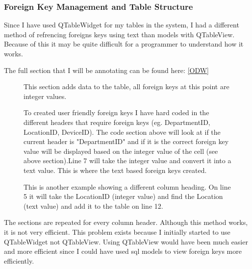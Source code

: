 \begin{landscape}
\subsubsection{Foreign Key Management and Table Structure}

Since I have used QTableWidget for my tables in the system, I had a different method of refrencing foreigns keys using text  than models with QTableView. Because of this it may be quite difficult for a programmer to understand how it works.

The full section that I will be annotating can be found here: \ref{ODW}

\begin{figure}[H]
    \caption{This section adds data to the table, all foreign keys at this point are integer values.}  
\end{figure}

\begin{figure}[H]
\begin{small}
\end{small}
    \caption{To created user friendly foreign keys I have hard coded in the different headers that require foreign keys (eg. DepartmentID, LocationID, DeviceID). The code section above will look at if the current header is "DepartmentID" and if it is the correct foreign key value will be displayed based on the integer value of the cell (see above section).\newline Line 7 will take the integer value and convert it into a text value. This is where the text based foreign keys created.}  
\end{figure}

\begin{figure}[H]
\begin{small}
\end{small}
    \caption{This is another example showing a different column heading. On line 5 it will take the LocationID (integer value) and find the Location (text value) and add it to the table on line 12.}  
\end{figure}

The sections are repeated for every column header. Although this method works, it is not very efficient. This problem exists because I initially started to use QTableWidget not QTableView. Using QTableView would have been much easier and more efficient since I could have used sql models to view foreign keys more efficiently.



\end{landscape}
